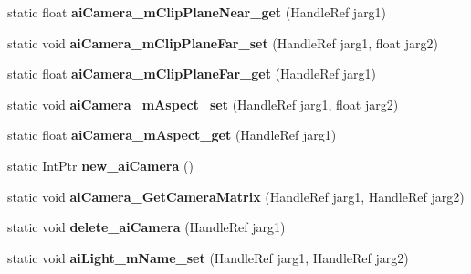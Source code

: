 \begin{DoxyCompactItemize}
\item 
\hypertarget{class_assimp_p_i_n_v_o_k_e_a67fc29b6aa9ed66e54546c4e61d48c40}{static float {\bfseries ai\+Camera\+\_\+m\+Clip\+Plane\+Near\+\_\+get} (Handle\+Ref jarg1)}\label{class_assimp_p_i_n_v_o_k_e_a67fc29b6aa9ed66e54546c4e61d48c40}

\item 
\hypertarget{class_assimp_p_i_n_v_o_k_e_a945b6f0541c7adaedd4ada1ec744c60a}{static void {\bfseries ai\+Camera\+\_\+m\+Clip\+Plane\+Far\+\_\+set} (Handle\+Ref jarg1, float jarg2)}\label{class_assimp_p_i_n_v_o_k_e_a945b6f0541c7adaedd4ada1ec744c60a}

\item 
\hypertarget{class_assimp_p_i_n_v_o_k_e_af1adb682b4dd766a428c12bb6f3f5a90}{static float {\bfseries ai\+Camera\+\_\+m\+Clip\+Plane\+Far\+\_\+get} (Handle\+Ref jarg1)}\label{class_assimp_p_i_n_v_o_k_e_af1adb682b4dd766a428c12bb6f3f5a90}

\item 
\hypertarget{class_assimp_p_i_n_v_o_k_e_af2e6d85b2094c74aefd0de5b645647b9}{static void {\bfseries ai\+Camera\+\_\+m\+Aspect\+\_\+set} (Handle\+Ref jarg1, float jarg2)}\label{class_assimp_p_i_n_v_o_k_e_af2e6d85b2094c74aefd0de5b645647b9}

\item 
\hypertarget{class_assimp_p_i_n_v_o_k_e_a6d53ca0f50bbbd867494290e87e7349a}{static float {\bfseries ai\+Camera\+\_\+m\+Aspect\+\_\+get} (Handle\+Ref jarg1)}\label{class_assimp_p_i_n_v_o_k_e_a6d53ca0f50bbbd867494290e87e7349a}

\item 
\hypertarget{class_assimp_p_i_n_v_o_k_e_a50bf5e99a8cdf3d5c243e3a93c502552}{static Int\+Ptr {\bfseries new\+\_\+ai\+Camera} ()}\label{class_assimp_p_i_n_v_o_k_e_a50bf5e99a8cdf3d5c243e3a93c502552}

\item 
\hypertarget{class_assimp_p_i_n_v_o_k_e_a0845bc5799e99f5527633dac519e9183}{static void {\bfseries ai\+Camera\+\_\+\+Get\+Camera\+Matrix} (Handle\+Ref jarg1, Handle\+Ref jarg2)}\label{class_assimp_p_i_n_v_o_k_e_a0845bc5799e99f5527633dac519e9183}

\item 
\hypertarget{class_assimp_p_i_n_v_o_k_e_a376bf5f6facd979d069f05805eaad635}{static void {\bfseries delete\+\_\+ai\+Camera} (Handle\+Ref jarg1)}\label{class_assimp_p_i_n_v_o_k_e_a376bf5f6facd979d069f05805eaad635}

\item 
\hypertarget{class_assimp_p_i_n_v_o_k_e_ab216ccb95751adc0035cf17828589b23}{static void {\bfseries ai\+Light\+\_\+m\+Name\+\_\+set} (Handle\+Ref jarg1, Handle\+Ref jarg2)}\label{class_assimp_p_i_n_v_o_k_e_ab216ccb95751adc0035cf17828589b23}


\end{DoxyCompactItemize}
